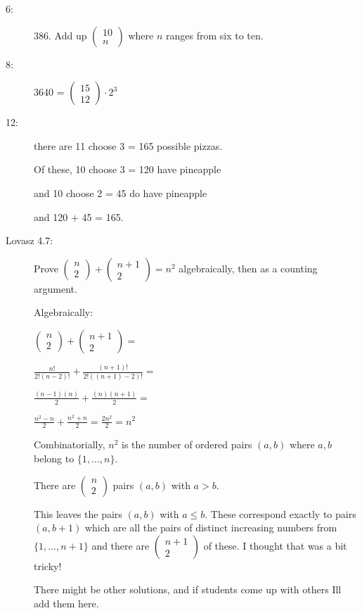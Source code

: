 \documentclass[12pt]{article}
\begin{document}
\begin{description}
\item[6:]  386.  Add up $\left(\begin{array}{c}10\\n \end{array}\right)$ where $n$ ranges from six to ten.

\item[8:]  3640 = $\left(\begin{array}{c}15\\12 \end{array}\right)\cdot 2^3$

\item[12:]  there are 11 choose 3 = 165 possible pizzas.

Of these, 10 choose 3 = 120 have pineapple

and 10 choose 2 = 45 do have pineapple

and 120 + 45 = 165.

\item[Lovasz 4.7:]

Prove $\left(\begin{array}{c}n\\2 \end{array}\right) +\left(\begin{array}{c}n+1\\2 \end{array}\right)=n^2$ algebraically, then as a counting argument.

Algebraically:

$\left(\begin{array}{c}n\\2 \end{array}\right) +\left(\begin{array}{c}n+1\\2 \end{array}\right)=$

$\frac{n!}{2!(n-2)!} + \frac{(n+1)!}{2!((n+1)-2)!} = $

$\frac{(n-1)(n)}{2} + \frac{(n)(n+1)}{2} =$

$\frac{n^2-n}2 + \frac{n^2+n}2 = \frac{2n^2}2 = n^2$

Combinatorially, $n^2$ is the number of ordered pairs $(a,b)$ where $a, b$ belong to $\{1,\ldots, n\}$.

There are $\left(\begin{array}{c}n\\2 \end{array}\right)$ pairs $(a,b)$ with $a > b$.

This leaves the pairs $(a,b)$ with $a \leq b$.  These correspond exactly to pairs $(a,b+1)$ which are all the pairs of distinct increasing numbers from $\{1,\ldots,n+1\}$ and there are $\left(\begin{array}{c}n+1\\2 \end{array}\right)$ of these.  I thought that was a bit tricky!

There might be other solutions, and if students come up with others Ill add them here.

\end{description}
\end{document}
